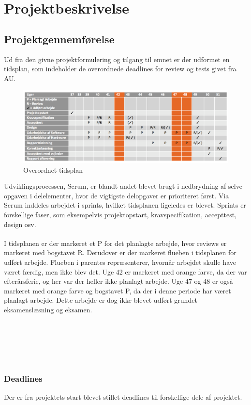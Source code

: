 \chapter{Projektbeskrivelse}

\section{Projektgennemførelse}
Ud fra den givne projektformulering og tilgang til emnet er der udformet en tidsplan, som indeholder de overordnede deadlines for review og tests givet fra AU.
\begin{figure}[H]
	\centering
	\includegraphics[width=1\textwidth]{Figurer/Snip20151210_74.png}
	\caption{Overordnet tidsplan}
\end{figure}
Udviklingsprocessen, Scrum, er blandt andet blevet brugt i nedbrydning af selve opgaven i delelementer, hvor de vigtigste delopgaver er prioriteret først. Via Scrum inddeles arbejdet i sprints, hvilket tidsplanen ligeledes er blevet. Sprints er forskellige faser, som eksempelvis projektopstart, kravspecifikation, accepttest, design osv.\\\\
I tidsplanen er der markeret et P for det planlagte arbejde, hvor reviews er markeret med bogstavet R. Derudover er der markeret flueben i tidsplanen for udført arbejde. Flueben i parentes repræsenterer, hvornår arbejdet skulle have været færdig, men ikke blev det. Uge 42 er markeret med orange farve, da der var efterårsferie, og her var der heller ikke planlagt arbejde. Uge 47 og 48 er også markeret med orange farve og bogstavet P, da der i denne periode har været planlagt arbejde. Dette arbejde er dog ikke blevet udført grundet eksamenslæsning og eksamen.
\\\\
\\\\
\\\\
\subsection{Deadlines}
Der er fra projektets start blevet stillet deadlines til forskellige dele af projektet.

